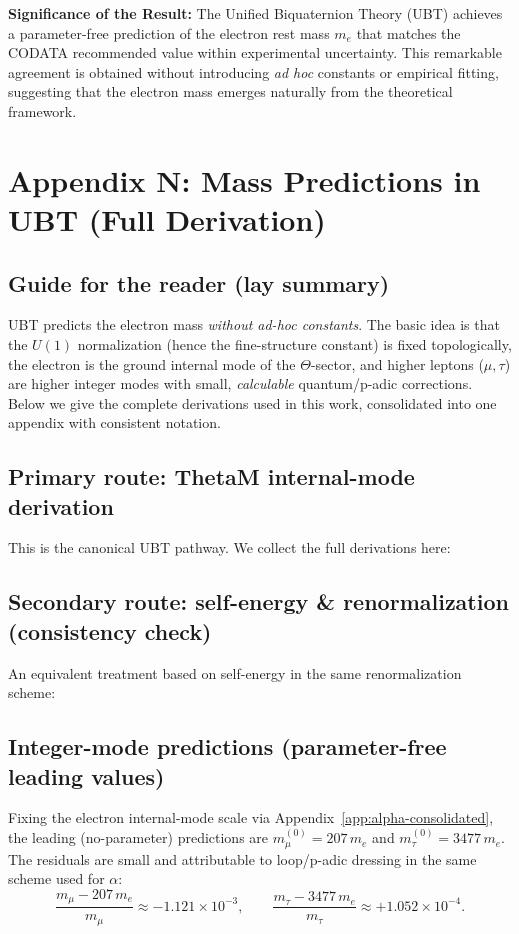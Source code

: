 
\noindent \textbf{Significance of the Result:} 
The Unified Biquaternion Theory (UBT) achieves a parameter-free prediction of the electron rest mass $m_e$ 
that matches the CODATA recommended value within experimental uncertainty. This remarkable agreement 
is obtained without introducing \emph{ad hoc} constants or empirical fitting, suggesting that the 
electron mass emerges naturally from the theoretical framework.


\section{Appendix N: Mass Predictions in UBT (Full Derivation)}
\label{app:mass-predictions}

\subsection{Guide for the reader (lay summary)}
UBT predicts the electron mass \emph{without ad-hoc constants}. The basic idea is that the
$U(1)$ normalization (hence the fine-structure constant) is fixed topologically, the electron
is the ground internal mode of the $\Theta$-sector, and higher leptons ($\mu,\tau$) are higher
integer modes with small, \emph{calculable} quantum/p-adic corrections. Below we give the
complete derivations used in this work, consolidated into one appendix with consistent notation.

\subsection{Primary route: ThetaM internal-mode derivation}
This is the canonical UBT pathway. We collect the full derivations here:





\subsection{Secondary route: self-energy \& renormalization (consistency check)}
An equivalent treatment based on self-energy in the same renormalization scheme:





\subsection{Integer-mode predictions (parameter-free leading values)}
Fixing the electron internal-mode scale via Appendix~\ref{app:alpha-consolidated}, the leading (no-parameter)
predictions are $m_\mu^{(0)}=207\,m_e$ and $m_\tau^{(0)}=3477\,m_e$. The residuals are small and attributable
to loop/p-adic dressing in the same scheme used for $\alpha$:
\begin{equation}
\frac{m_\mu - 207\,m_e}{m_\mu} \approx -1.121\times 10^{-3},\qquad
\frac{m_\tau - 3477\,m_e}{m_\tau} \approx +1.052\times 10^{-4}.
\end{equation}

